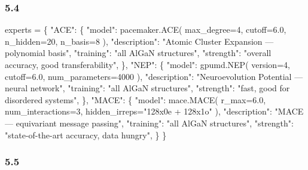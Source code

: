 \documentclass[
  12pt,
]{article}
\newenvironment{Shaded}{}{}
\newcommand{\DecValTok}[1]{\textcolor[rgb]{0.25,0.63,0.44}{#1}}
\newcommand{\FloatTok}[1]{\textcolor[rgb]{0.25,0.63,0.44}{#1}}
\newcommand{\NormalTok}[1]{#1}
\newcommand{\OperatorTok}[1]{\textcolor[rgb]{0.40,0.40,0.40}{#1}}
\newcommand{\StringTok}[1]{\textcolor[rgb]{0.25,0.44,0.63}{#1}}
\begin{document}
\subsubsection{5.4 }\label{ux4e13ux5bb6ux5b9aux4e49-1}

\begin{Shaded}
\begin{Highlighting}[]
\NormalTok{experts }\OperatorTok{=}\NormalTok{ \{}
    \StringTok{"ACE"}\NormalTok{: \{}
        \StringTok{"model"}\NormalTok{: pacemaker.ACE(}
\NormalTok{            max\_degree}\OperatorTok{=}\DecValTok{4}\NormalTok{, cutoff}\OperatorTok{=}\FloatTok{6.0}\NormalTok{,}
\NormalTok{            n\_hidden}\OperatorTok{=}\DecValTok{20}\NormalTok{, n\_basis}\OperatorTok{=}\DecValTok{8}
\NormalTok{        ),}
        \StringTok{"description"}\NormalTok{: }\StringTok{"Atomic Cluster Expansion — polynomial basis"}\NormalTok{,}
        \StringTok{"training"}\NormalTok{: }\StringTok{"all AlGaN structures"}\NormalTok{,}
        \StringTok{"strength"}\NormalTok{: }\StringTok{"overall accuracy, good transferability"}\NormalTok{,}
\NormalTok{    \},}
    \StringTok{"NEP"}\NormalTok{: \{}
        \StringTok{"model"}\NormalTok{: gpumd.NEP(}
\NormalTok{            version}\OperatorTok{=}\DecValTok{4}\NormalTok{, cutoff}\OperatorTok{=}\FloatTok{6.0}\NormalTok{,}
\NormalTok{            num\_parameters}\OperatorTok{=}\DecValTok{4000}
\NormalTok{        ),}
        \StringTok{"description"}\NormalTok{: }\StringTok{"Neuroevolution Potential — neural network"}\NormalTok{,}
        \StringTok{"training"}\NormalTok{: }\StringTok{"all AlGaN structures"}\NormalTok{,}
        \StringTok{"strength"}\NormalTok{: }\StringTok{"fast, good for disordered systems"}\NormalTok{,}
\NormalTok{    \},}
    \StringTok{"MACE"}\NormalTok{: \{}
        \StringTok{"model"}\NormalTok{: mace.MACE(}
\NormalTok{            r\_max}\OperatorTok{=}\FloatTok{6.0}\NormalTok{, num\_interactions}\OperatorTok{=}\DecValTok{3}\NormalTok{,}
\NormalTok{            hidden\_irreps}\OperatorTok{=}\StringTok{"128x0e + 128x1o"}
\NormalTok{        ),}
        \StringTok{"description"}\NormalTok{: }\StringTok{"MACE — equivariant message passing"}\NormalTok{,}
        \StringTok{"training"}\NormalTok{: }\StringTok{"all AlGaN structures"}\NormalTok{,}
        \StringTok{"strength"}\NormalTok{: }\StringTok{"state{-}of{-}the{-}art accuracy, data hungry"}\NormalTok{,}
\NormalTok{    \}}
\NormalTok{\}}
\end{Highlighting}
\end{Shaded}

\subsubsection{5.5 }\label{ux9a8cux8bc1ux5047ux8bbe-1}
\end{document}
